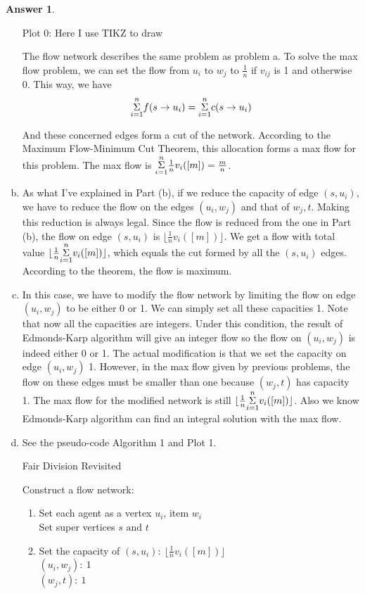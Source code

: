 \documentclass{article}
\theoremstyle{definition}
\newtheorem{ans}{Answer}
\begin{document}
\begin{ans}
\begin{enumerate}[(a)]
\begin{center}
			Plot 0: Here I use TIKZ to draw
			\end{center}
			The flow network describes the same problem as problem a. To solve the max flow problem, we can set the flow from $u_i \text{ to } w_j$ to $\frac{1}{n}$ if $v_{ij}$ is 1 and otherwise 0. This way, we have
			$$
			\overunderset{n}{i=1}{\Sigma} f(s\rightarrow u_i)=\overunderset{n}{i=1}{\Sigma} c(s\rightarrow u_i)
			$$
			
			And these concerned edges form a cut of the network. According to the Maximum Flow-Minimum Cut Theorem, this allocation forms a max flow for this problem. The max flow is $\overunderset{n}{i=1}{\Sigma} \frac{1}{n} v_{i}([m])=\frac{m}{n}$.
			\item As what I've explained in Part (b), if we reduce the capacity of edge $(s, u_i)$, we have to reduce the flow on the edges $(u_i, w_j)$ and that of $w_j, t$. Making this reduction is always legal. Since the flow is reduced from the one in Part (b), the flow on edge $(s, u_i)$ is $\lfloor\frac{1}{n}v_i([m])\rfloor$. We get a flow with total value $\lfloor\frac{1}{n}\overunderset{n}{i=1}{\Sigma}v_i( [m])\rfloor$, which equals the cut formed by all the $(s, u_i)$ edges. According to the theorem, the flow is maximum.
			\item In this case, we have to modify the flow network by limiting the flow on edge $(u_i, w_j)$ to be either 0 or 1. We can simply set all these capacities 1. Note that now all the capacities are integers. Under this condition, the result of Edmonds-Karp algorithm will give an integer flow so the flow on $(u_i, w_j)$ is indeed either 0 or 1. The actual modification is that we set the capacity on edge $(u_i, w_j)$ 1. However, in the max flow given by previous problems, the flow on these edges must be smaller than one because $(w_j, t)$ has capacity 1. The max flow for the modified network is still $\lfloor\frac{1}{n}\overunderset{n}{i=1}{\Sigma}v_i( [m])\rfloor$. Also we know Edmonds-Karp algorithm can find an integral solution with the max flow. 
			\item See the pseudo-code Algorithm 1 and Plot 1. 
			\begin{algorithm}[h]
				\caption{Fair Division Revisited}
				\BlankLine
				Construct a flow network:
				\begin{enumerate}
					\item Set each agent as a vertex $u_i$, item $w_i$ \\
					Set super vertices $s \text{ and } t$
					\item Set the capacity of $(s, u_i):~\lfloor\frac{1}{n}v_i([m])\rfloor$ \\
					$(u_i, w_j):~1$ \\ $(w_j, t):~1$ 
				\end{enumerate}
				

\end{algorithm}
\end{enumerate}
\end{ans}
\end{document}
